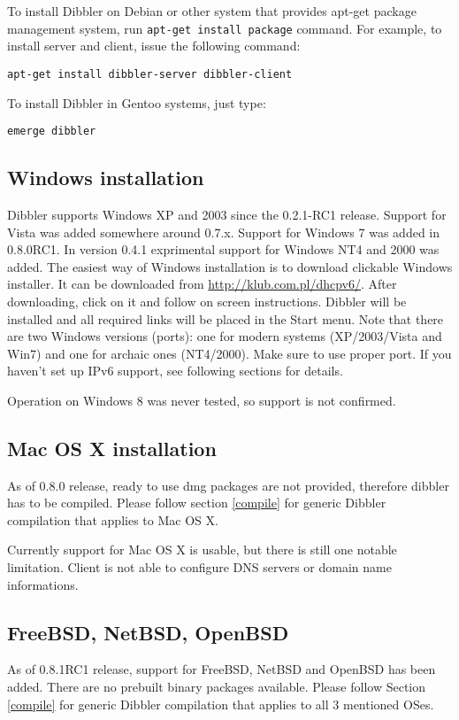 To install Dibbler on Debian or other system that provides apt-get
package management system, run \verb+apt-get install package+
command. For example, to install server and client, issue the
following command:

\begin{lstlisting}
apt-get install dibbler-server dibbler-client
\end{lstlisting}

To install Dibbler in Gentoo systems, just type:
\begin{lstlisting}
emerge dibbler
\end{lstlisting}

\subsection{Windows installation}
Dibbler supports Windows XP and 2003 since the 0.2.1-RC1 release.
Support for Vista was added somewhere around 0.7.x. Support for
Windows 7 was added in 0.8.0RC1. In version 0.4.1 exprimental support
for Windows NT4 and 2000 was added. The easiest way of Windows
installation is to download clickable Windows installer. It can be
downloaded from \url{http://klub.com.pl/dhcpv6/}. After downloading,
click on it and follow on screen instructions. Dibbler will be
installed and all required links will be placed in the Start
menu. Note that there are two Windows versions (ports): one for modern
systems (XP/2003/Vista and Win7) and one for archaic ones
(NT4/2000). Make sure to use proper port. If you haven't set up IPv6
support, see following sections for details.

Operation on Windows 8 was never tested, so support is not confirmed.

\subsection{Mac OS X installation}
As of 0.8.0 release, ready to use dmg packages are not provided,
therefore dibbler has to be compiled. Please follow section
\ref{compile} for generic Dibbler compilation that applies to Mac OS
X.

Currently support for Mac OS X is usable, but there is still one
notable limitation. Client is not able to configure DNS servers or
domain name informations.

\subsection{FreeBSD, NetBSD, OpenBSD}
As of 0.8.1RC1 release, support for FreeBSD, NetBSD and OpenBSD has
been added. There are no prebuilt binary packages available. Please
follow Section \ref{compile} for generic Dibbler compilation that applies to
all 3 mentioned OSes.


